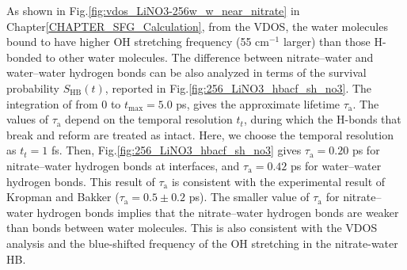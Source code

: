 As shown in Fig.\thinspace\ref{fig:vdos_LiNO3-256w_w_near_nitrate} in Chapter\thinspace\ref{CHAPTER_SFG_Calculation}, 
from the VDOS, the water molecules bound to \nitrate have higher OH stretching frequency (55 cm$^{-1}$ larger) 
than those H-bonded to other water molecules. 
%
The difference between nitrate--water and water--water hydrogen bonds 
can be also analyzed in terms of the survival probability $S_{\text{HB}}(t)$, \cite{AKS86,JT90,AL96} 
reported in Fig.\thinspace\ref {fig:256_LiNO3_hbacf_sh_no3}.
The integration of \SHB from 0 to $t_{\max}=5.0$ ps, \cite{Steinel2004} gives the approximate lifetime $\tau_\text{a}$. \cite{SC02} 
The values of $\tau_{\text{a}}$ depend on the temporal resolution $t_t$, during which the H-bonds that break and reform are treated as intact. \cite{AL00} 
%
Here, we choose the temporal resolution as $t_t=1$ fs. 
Then, Fig.\thinspace\ref {fig:256_LiNO3_hbacf_sh_no3} gives $\tau_\text{a}=0.20$ ps for nitrate--water hydrogen bonds at interfaces, and $\tau_\text{a}=0.42$ ps for water--water hydrogen bonds.
This result of $\tau_\text{a}$ is consistent with the experimental result of Kropman and Bakker ($\tau_\text{a}=0.5\pm0.2$ ps). \cite{MFK01}
The smaller value of $\tau_\text{a}$ for nitrate--water hydrogen bonds implies that the nitrate--water hydrogen bonds are weaker than bonds between water molecules. 
This is also consistent with the VDOS analysis and the blue-shifted frequency of the OH stretching in the nitrate-water HB. 

\FloatBarrier
